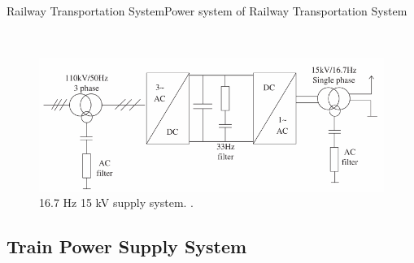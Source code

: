 \begin{frame}{Railway Transportation System}{Power system of Railway Transportation System}
\begin{minipage}[t]{0.48\linewidth}
	
\end{minipage}

\begin{minipage}[t]{0.24\linewidth} ~ \end{minipage}
\begin{minipage}[t]{0.48\linewidth}

\begin{figure}[ht!]
	\centering
	\includegraphics[width=\textwidth,keepaspectratio]{figures/31.PowerS/abad2016e}
	\caption{16.7 Hz 15 kV supply system. \cite{abad2016}.}
\end{figure}
\end{minipage}

\end{frame}

\subsection{Train Power Supply System}

